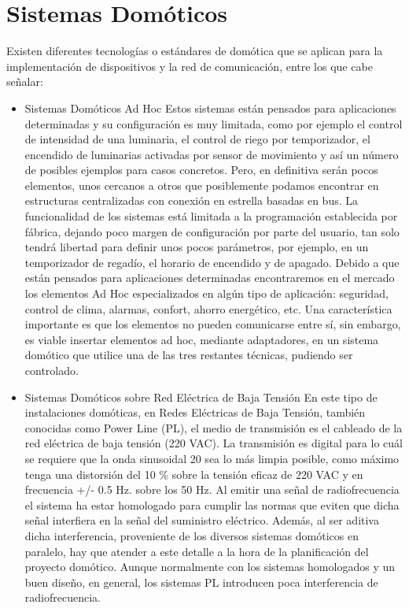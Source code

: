 \documentclass[11pt,letterpaper]{report}
\begin{document}
		\section{Sistemas Domóticos}
		Existen diferentes tecnologías o estándares de domótica que se aplican para la implementación de dispositivos y la red de comunicación, entre los que cabe señalar:
		\begin{itemize}
		\item Sistemas Domóticos Ad Hoc 
Estos sistemas están pensados para aplicaciones determinadas y su configuración es muy limitada, como por ejemplo el control de intensidad de una luminaria, el control de riego por temporizador, el encendido de luminarias activadas por sensor de movimiento y así un número de posibles ejemplos para casos concretos. Pero, en definitiva serán pocos elementos, unos cercanos a otros que posiblemente podamos encontrar en estructuras centralizadas con conexión en estrella basadas en bus.
La funcionalidad de los sistemas está limitada a la programación establecida por fábrica, dejando poco margen de configuración por parte del usuario, tan solo tendrá libertad para definir unos pocos parámetros, por ejemplo, en un temporizador de regadío, el horario de encendido y de apagado.
Debido a que están pensados para aplicaciones determinadas encontraremos en el mercado los elementos Ad Hoc especializados en algún tipo de aplicación: seguridad, control de clima, alarmas, confort, ahorro energético, etc. Una característica importante es que los elementos no pueden comunicarse entre sí, sin embargo, es viable insertar elementos ad hoc, mediante adaptadores, en un sistema domótico que utilice una de las tres restantes técnicas, pudiendo ser controlado\citep{Pedro2009}.
		\item Sistemas Domóticos sobre Red Eléctrica de Baja Tensión
En este tipo de instalaciones domóticas, en Redes Eléctricas de Baja Tensión, también conocidas como Power Line (PL), el medio de transmisión es el cableado de la red eléctrica de baja tensión (220 VAC). La transmisión es digital para lo cuál se requiere que la onda sinusoidal 20 sea lo más limpia posible, como máximo tenga una distorsión del 10 \% sobre la tensión eficaz de 220 VAC y en frecuencia +/- 0.5 Hz. sobre los 50 Hz.
Al emitir una señal de radiofrecuencia el sistema ha estar homologado para cumplir las normas que eviten que dicha señal interfiera en la señal del suministro eléctrico. Además, al ser aditiva dicha interferencia, proveniente de los diversos sistemas domóticos en paralelo, hay que atender a este detalle a la hora de la planificación del proyecto domótico. Aunque normalmente con los sistemas homologados y un buen diseño, en general, los sistemas PL introducen poca interferencia de radiofrecuencia.

\end{itemize}
\end{document}
